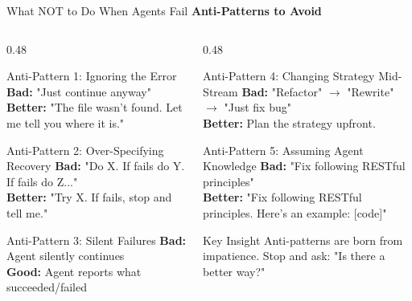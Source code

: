\documentclass[aspectratio=169,11pt]{beamer}
\begin{document}
\begin{frame}{What NOT to Do When Agents Fail}
    \textbf{Anti-Patterns to Avoid}

    \begin{columns}[T]
        \begin{column}{0.48\textwidth}
            \begin{alertblock}{Anti-Pattern 1: Ignoring the Error}
                \textbf{Bad:} "Just continue anyway"\\
                \textbf{Better:} "The file wasn't found. Let me tell you where it is."
            \end{alertblock}

            \begin{alertblock}{Anti-Pattern 2: Over-Specifying Recovery}
                \textbf{Bad:} "Do X. If fails do Y. If fails do Z..."\\
                \textbf{Better:} "Try X. If fails, stop and tell me."
            \end{alertblock}

            \begin{alertblock}{Anti-Pattern 3: Silent Failures}
                \textbf{Bad:} Agent silently continues\\
                \textbf{Good:} Agent reports what succeeded/failed
            \end{alertblock}
        \end{column}
        \begin{column}{0.48\textwidth}
            \begin{alertblock}{Anti-Pattern 4: Changing Strategy Mid-Stream}
                \textbf{Bad:} "Refactor" $\rightarrow$ "Rewrite" $\rightarrow$ "Just fix bug"\\
                \textbf{Better:} Plan the strategy upfront.
            \end{alertblock}

            \begin{alertblock}{Anti-Pattern 5: Assuming Agent Knowledge}
                \textbf{Bad:} "Fix following RESTful principles"\\
                \textbf{Better:} "Fix following RESTful principles. Here's an example: [code]"
            \end{alertblock}

            \vspace{0.3cm}
            \begin{block}{Key Insight}
                Anti-patterns are born from impatience. Stop and ask: "Is there a better way?"
            \end{block}
        \end{column}
    \end{columns}
\end{frame}
\end{document}

